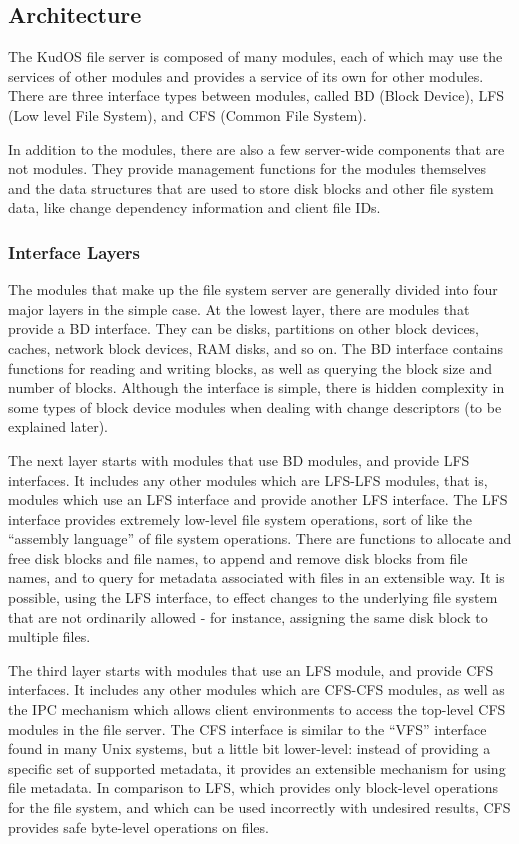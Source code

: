 \subsection{Architecture}
\label{sec:solution:arch}

The KudOS file server is composed of many modules, each of which may use the
services of other modules and provides a service of its own for other modules.
There are three interface types between modules, called BD (Block Device), LFS
(Low level File System), and CFS (Common File System).

In addition to the modules, there are also a few server-wide components that are
not modules. They provide management functions for the modules themselves and
the data structures that are used to store disk blocks and other file system
data, like change dependency information and client file IDs.

\subsubsection{Interface Layers}
\label{sec:solution:arch:layers}

The modules that make up the file system server are generally divided into four
major layers in the simple case. At the lowest layer, there are modules that
provide a BD interface. They can be disks, partitions on other block devices,
caches, network block devices, RAM disks, and so on. The BD interface contains
functions for reading and writing blocks, as well as querying the block size and
number of blocks. Although the interface is simple, there is hidden complexity
in some types of block device modules when dealing with change descriptors (to
be explained later).

The next layer starts with modules that use BD modules, and provide LFS
interfaces. It includes any other modules which are LFS-LFS modules, that is,
modules which use an LFS interface and provide another LFS interface. The LFS
interface provides extremely low-level file system operations, sort of like the
``assembly language'' of file system operations. There are functions to allocate
and free disk blocks and file names, to append and remove disk blocks from file
names, and to query for metadata associated with files in an extensible way. It
is possible, using the LFS interface, to effect changes to the underlying
file system that are not ordinarily allowed - for instance, assigning the same
disk block to multiple files.

The third layer starts with modules that use an LFS module, and provide CFS
interfaces. It includes any other modules which are CFS-CFS modules, as well as
the IPC mechanism which allows client environments to access the top-level CFS
modules in the file server. The CFS interface is similar to the ``VFS''
interface found in many Unix systems, but a little bit lower-level: instead of
providing a specific set of supported metadata, it provides an extensible
mechanism for using file metadata. In comparison to LFS, which provides only
block-level operations for the file system, and which can be used incorrectly
with undesired results, CFS provides safe byte-level operations on files.

